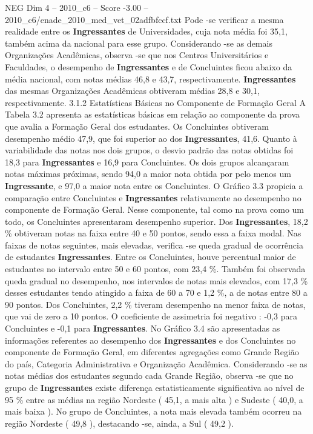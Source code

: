 \begin{textsample}{NEG Dim 4 – 2010\_c6 – Score -3.00 – 2010\_c6/enade\_2010\_med\_vet\_02adfbfccf.txt}
Pode -se verificar a mesma realidade entre os \textbf{Ingressantes} de Universidades, cuja nota média foi 35,1, também acima da nacional para esse grupo.
Considerando -se as demais Organizações Acadêmicas, observa -se que nos Centros Universitários e Faculdades, o desempenho de \textbf{Ingressantes} e de Concluintes ficou abaixo da média nacional, com notas médias 46,8 e 43,7, respectivamente. \textbf{Ingressantes} das mesmas Organizações Acadêmicas obtiveram médias 28,8 e 30,1, respectivamente. 3.1.2 Estatísticas Básicas no Componente de Formação Geral A Tabela 3.2 apresenta as estatísticas básicas em relação ao componente da prova que avalia a Formação Geral dos estudantes.
Os Concluintes obtiveram desempenho médio 47,9, que foi superior ao dos \textbf{Ingressantes}, 41,6.
Quanto à variabilidade das notas nos dois grupos, o desvio padrão das notas obtidas foi 18,3 para \textbf{Ingressantes} e 16,9 para Concluintes.
Os dois grupos alcançaram notas máximas próximas, sendo 94,0 a maior nota obtida por pelo menos um \textbf{Ingressante}, e 97,0 a maior nota entre os Concluintes.
O Gráfico 3.3 propicia a comparação entre Concluintes e \textbf{Ingressantes} relativamente ao desempenho no componente de Formação Geral.
Nesse componente, tal como na prova como um todo, os Concluintes apresentaram desempenho superior.
Dos \textbf{Ingressantes}, 18,2 \% obtiveram notas na faixa entre 40 e 50 pontos, sendo essa a faixa modal.
Nas faixas de notas seguintes, mais elevadas, verifica -se queda gradual de ocorrência de estudantes \textbf{Ingressantes}.
Entre os Concluintes, houve percentual maior de estudantes no intervalo entre 50 e 60 pontos, com 23,4 \%.
Também foi observada queda gradual no desempenho, nos intervalos de notas mais elevados, com 17,3 \% desses estudantes tendo atingido a faixa de 60 a 70 e 1,2 \%, a de notas entre 80 a 90 pontos.
Dos Concluintes, 2,2 \% tiveram desempenho na menor faixa de notas, que vai de zero a 10 pontos.
O coeficiente de assimetria foi negativo : -0,3 para Concluintes e -0,1 para \textbf{Ingressantes}.
No Gráfico 3.4 são apresentadas as informações referentes ao desempenho dos \textbf{Ingressantes} e dos Concluintes no componente de Formação Geral, em diferentes agregações como Grande Região do país, Categoria Administrativa e Organização Acadêmica.
Considerando -se as notas médias dos estudantes segundo cada Grande Região, observa -se que no grupo de \textbf{Ingressantes} existe diferença estatisticamente significativa ao nível de 95 \% entre as médias na região Nordeste ( 45,1, a mais alta ) e Sudeste ( 40,0, a mais baixa ).
No grupo de Concluintes, a nota mais elevada também ocorreu na região Nordeste ( 49,8 ), destacando -se, ainda, a Sul ( 49,2 ).

\end{textsample}
